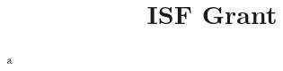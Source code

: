 \documentclass{article}
\title{ISF Grant}
\author{}
\begin{document}
\maketitle

\begin{abstract}
	a
\end{abstract}




\end{document}
